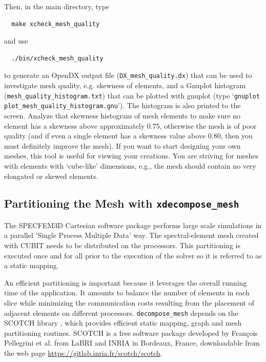 \noindent
Then, in the main directory, type
{\small
\begin{verbatim}
  make xcheck_mesh_quality
\end{verbatim}
}
and use
{\small
\begin{verbatim}
  ./bin/xcheck_mesh_quality
\end{verbatim}
}
to generate an %
OpenDX output file (\texttt{\small DX\_mesh\_quality.dx}{\small )
that can be used to investigate mesh quality, e.g. skewness of elements,
and a Gnuplot histogram (}\texttt{\small mesh\_quality\_histogram.txt}{\small )
that can be plotted with gnuplot (type `}\texttt{\small gnuplot plot\_mesh\_quality\_histogram.gnu}{\small ').
The histogram is also printed to the screen. Analyze that skewness
histogram of mesh elements to make sure no element has a skewness
above approximately 0.75, otherwise the mesh is of poor quality (and
if even a single element has a skewness value above 0.80, then you
must definitely improve the mesh). If you want to start designing
your own meshes, this tool is useful for viewing your creations. You
are striving for meshes with elements with `cube-like' dimensions,
e.g., the mesh should contain no very elongated or skewed elements.}{\small \par}


\subsection{Partitioning the Mesh with \texttt{xdecompose\_mesh}}

The SPECFEM3D Cartesian software package performs large scale simulations
in a parallel 'Single Process Multiple Data' way. The spectral-element
mesh created with CUBIT needs to be distributed on the processors.
This partitioning is executed once and for all prior to the execution
of the solver so it is referred to as a static mapping.

An efficient partitioning is important because it leverages the overall
running time of the application. It amounts to balance the number
of elements in each slice while minimizing the communication costs
resulting from the placement of adjacent elements on different processors.
\texttt{decompose\_mesh} depends on the SCOTCH library \citep{PeRo96},
which provides efficient static mapping, graph and mesh partitioning
routines. SCOTCH is a free software package developed by Fran\c{c}ois
Pellegrini et al. from LaBRI and INRIA in Bordeaux, France, downloadable
from the web page \url{https://gitlab.inria.fr/scotch/scotch}.\\


